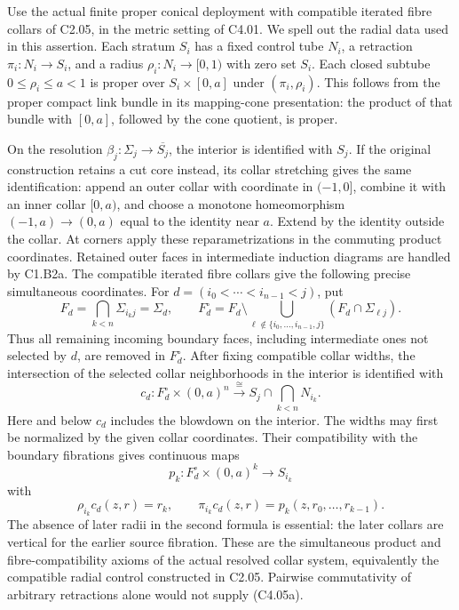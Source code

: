 Use the actual finite proper conical deployment with compatible iterated fibre collars of C2.05, in the metric setting of C4.01. We spell out the radial data used in this assertion. Each stratum \(S_i\) has a fixed control tube \(N_i\), a retraction \(\pi_i:N_i\to S_i\), and a radius \(\rho_i:N_i\to[0,1)\) with zero set \(S_i\). Each closed subtube \(0\le\rho_i\le a<1\) is proper over \(S_i\times[0,a]\) under \((\pi_i,\rho_i)\). This follows from the proper compact link bundle in its mapping-cone presentation: the product of that bundle with \([0,a]\), followed by the cone quotient, is proper.

On the resolution \(\beta_j:\Sigma_j\to\overline{S_j}\), the interior is identified with \(S_j\). If the original construction retains a cut core instead, its collar stretching gives the same identification: append an outer collar with coordinate in \((-1,0]\), combine it with an inner collar \([0,a)\), and choose a monotone homeomorphism \((-1,a)\to(0,a)\) equal to the identity near \(a\). Extend by the identity outside the collar. At corners apply these reparametrizations in the commuting product coordinates. Retained outer faces in intermediate induction diagrams are handled by C1.B2a. The compatible iterated fibre collars give the following precise simultaneous coordinates. For
\(d=(i_0<\cdots<i_{n-1}<j)\), put
\[
 F_d=\bigcap_{k<n}\Sigma_{i_kj}=\Sigma_d,
 \qquad F_d^\circ=F_d\setminus
       \bigcup_{\ell\notin\{i_0,\ldots,i_{n-1},j\}}
                  (F_d\cap\Sigma_{\ell j}).
\]
Thus all remaining incoming boundary faces, including intermediate ones not selected by \(d\), are removed in \(F_d^\circ\). After fixing compatible collar widths, the intersection of the selected collar neighborhoods in the interior is identified with
\[
 c_d:F_d^\circ\times(0,a)^n\xrightarrow{\cong}
           S_j\cap\bigcap_{k<n}N_{i_k}.
\]
Here and below \(c_d\) includes the blowdown on the interior. The widths may first be normalized by the given collar coordinates. Their compatibility with the boundary fibrations gives continuous maps
\[
 p_k:F_d^\circ\times(0,a)^k\longrightarrow S_{i_k}
\]
with
\[
 \rho_{i_k}c_d(z,r)=r_k,
 \qquad
 \pi_{i_k}c_d(z,r)=p_k(z,r_0,\ldots,r_{k-1}).
 \tag{C4.05a}
\]
The absence of later radii in the second formula is essential: the later collars are vertical for the earlier source fibration. These are the simultaneous product and fibre-compatibility axioms of the actual resolved collar system, equivalently the compatible radial control constructed in C2.05. Pairwise commutativity of arbitrary retractions alone would not supply (C4.05a).

